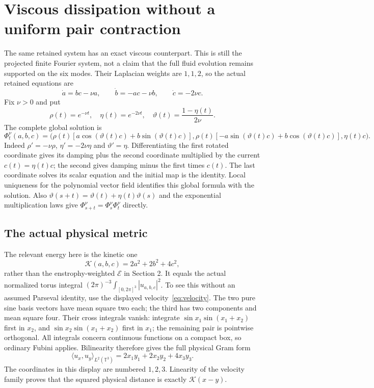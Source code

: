 \documentclass[11pt]{article}
\begin{document}
\section{Viscous dissipation without a uniform pair contraction}
\label{sec:viscoustriad}
The same retained system has an exact viscous counterpart. This is
still the projected finite Fourier system, not a claim that the full
fluid evolution remains supported on the six modes. Their Laplacian
weights are $1,1,2$, so the actual retained equations are
\begin{equation}\label{eq:viscousode}
 \dot a=bc-\nu a,\qquad \dot b=-ac-\nu b,\qquad
 \dot c=-2\nu c.
\end{equation}
Fix $\nu>0$ and put
\[
 \rho(t)=e^{-\nu t},\quad \eta(t)=e^{-2\nu t},\quad
 \vartheta(t)=\frac{1-\eta(t)}{2\nu}.
\]
The complete global solution is
\begin{equation}\label{eq:viscousflow}
 \Phi_t^\nu(a,b,c)=
 \bigl(\rho(t)[a\cos(\vartheta(t)c)+b\sin(\vartheta(t)c)],
       \rho(t)[-a\sin(\vartheta(t)c)+b\cos(\vartheta(t)c)],
       \eta(t)c\bigr).
\end{equation}
Indeed $\rho'=-\nu\rho$, $\eta'=-2\nu\eta$ and
$\vartheta'=\eta$. Differentiating the first rotated coordinate
gives its damping plus the second coordinate multiplied by the
current $c(t)=\eta(t)c$; the second gives damping minus the first
times $c(t)$. The last coordinate solves its scalar equation and
the initial map is the identity. Local uniqueness for the polynomial
vector field identifies this global formula with the solution.
Also
$\vartheta(s+t)=\vartheta(t)+\eta(t)\vartheta(s)$ and the
exponential multiplication laws give
$\Phi_{s+t}^\nu=\Phi_s^\nu\Phi_t^\nu$ directly.

\subsection*{The actual physical metric}
The relevant energy here is the kinetic one
\[
 \mathcal K(a,b,c)=2a^2+2b^2+4c^2,
\]
rather than the enstrophy-weighted $\mathcal E$ in Section 2.
It equals the actual normalized torus integral
$(2\pi)^{-3}\int_{[0,2\pi]^3}|u_{a,b,c}|^2$.
To see this without an assumed Parseval identity, use the displayed
velocity~\eqref{eq:velocity}. The two pure sine basis vectors have
mean square two each; the third has two components and mean square
four. Their cross integrals vanish: integrate
$\sin x_1\sin(x_1+x_2)$ first in $x_2$, and
$\sin x_2\sin(x_1+x_2)$ first in $x_1$; the remaining pair is
pointwise orthogonal. All integrals concern continuous functions on
a compact box, so ordinary Fubini applies. Bilinearity therefore gives
the full physical Gram form
\[
 \langle u_x,u_y\rangle_{L^2(\mathbb T^3)}
 =2x_1y_1+2x_2y_2+4x_3y_3.
\]
The coordinates in this display are numbered $1,2,3$.
Linearity of the velocity family proves that the squared physical
distance is exactly $\mathcal K(x-y)$.
\end{document}
